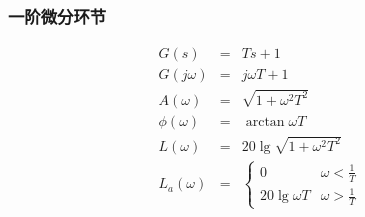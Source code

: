 \documentclass[table]{beamer}
\begin{document}
\subsubsection{一阶微分环节}
\label{sec:org90892d2}
\begin{eqnarray*}
G(s) & = & Ts+1\\
G(j\omega) & =& j\omega T+1\\
A(\omega) &=& \sqrt{1+\omega^2 T^2}\\
\phi(\omega) &=& \arctan{\omega T} \\
L(\omega)&=& 20\lg\sqrt{1+\omega^2 T^2}\\
L_a(\omega)&=& \begin{cases} 0 & \omega<\frac{1}{T} \\  20\lg\omega T & \omega>\frac{1}{T}\end{cases}
\end{eqnarray*}
\end{document}
